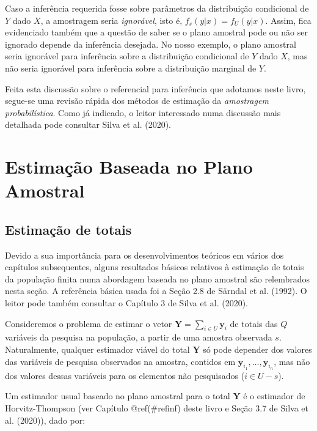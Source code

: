 \documentclass[
  12pt,
  brazilian,
]{book}
\theoremstyle{definition}
\theoremstyle{definition}
\theoremstyle{definition}
\theoremstyle{definition}
\theoremstyle{remark}
\begin{document}
Caso a inferência requerida fosse sobre parâmetros da distribuição condicional
de \(Y\) dado \(X\), a amostragem seria \emph{ignorável}, isto é, \(f_s ( y | x) = f_U (y | x)\).
Assim, fica evidenciado também que a questão de saber se o plano amostral pode
ou não ser ignorado depende da inferência desejada. No nosso exemplo, o plano amostral
seria ignorável para inferência sobre a distribuição condicional de \(Y\) dado \(X\),
mas não seria ignorável para inferência sobre a distribuição marginal de \(Y\).

Feita esta discussão sobre o referencial para inferência que adotamos neste
livro, segue-se uma revisão rápida dos métodos de estimação da \emph{amostragem probabilística}.
Como já indicado, o leitor interessado numa discussão mais detalhada pode consultar Silva et al. (2020).

\hypertarget{capplanamo}{%
\chapter{Estimação Baseada no Plano Amostral}\label{capplanamo}}

\hypertarget{estimatotais}{%
\section{Estimação de totais}\label{estimatotais}}

Devido a sua importância para os desenvolvimentos teóricos em vários dos capítulos subsequentes, alguns resultados básicos relativos à estimação de totais da população finita numa abordagem baseada no plano amostral são relembrados nesta seção. A referência básica usada foi a Seção 2.8 de Särndal et al. (1992). O leitor pode também consultar o Capítulo 3 de Silva et al. (2020).

Consideremos o problema de estimar o vetor \(\mathbf{Y} = \sum_{i \in U} \mathbf{y}_i\) de totais das \(Q\) variáveis da pesquisa na população, a partir de uma amostra observada \(s\). Naturalmente, qualquer estimador viável do total \(\mathbf{Y}\) só pode depender dos valores das variáveis de pesquisa observados na amostra, contidos em \(\mathbf{y}_{i_{1}}, \ldots , \mathbf{y}_{i_{n}}\), mas não dos valores dessas variáveis para os elementos não pesquisados (\(i \in U-s\)).

Um estimador usual baseado no plano amostral para o total \(\mathbf{Y}\) é o estimador de Horvitz-Thompson (ver Capítulo @ref(\#refinf) deste livro e Seção 3.7 de Silva et al. (2020)), dado por:
\end{document}
